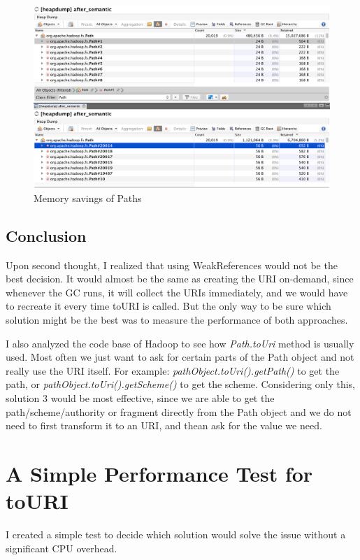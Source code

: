 \begin{figure}[H]
	\includegraphics[width=150mm, keepaspectratio]{figures/path_before_after.png}
	\centering
	\caption{Memory savings of Paths}
\end{figure}

\subsection{Conclusion}
Upon second thought, I realized that using WeakReferences would not be the best decision. It would almost be the same as creating the URI on-demand, since whenever the GC runs, it will collect the URIs immediately, and we would have to recreate it every time toURI is called. But the only way to be sure which solution might be the best was to measure the performance of both approaches. 

I also analyzed the code base of Hadoop to see how \textit{Path.toUri} method is usually used. Most often we just want to ask for certain parts of the Path object and not really use the URI itself. For example: \textit{pathObject.toUri().getPath()} to get the path, or \textit{pathObject.toUri().getScheme()} to get the scheme. Considering only this, solution 3 would be most effective, since we are able to get the path/scheme/authority or fragment directly from the Path object and we do not need to first transform it to an URI, and thean ask for the value we need. 

\section{A Simple Performance Test for toURI}
I created a simple test to decide which solution would solve the issue without a significant CPU overhead. 

